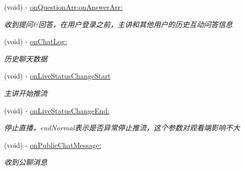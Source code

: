 \begin{DoxyCompactItemize}
(void) -\/ \hyperlink{protocol_request_data_delegate_01-p_a5995fc6c05c04b1f0a16469d574a5cd5}{on\+Question\+Arr\+:on\+Answer\+Arr\+:}
\begin{DoxyCompactList}\small\item\em 收到提问\&回答，在用户登录之前，主讲和其他用户的历史互动问答信息 \end{DoxyCompactList}\item 
\mbox{\label{protocol_request_data_delegate_01-p_a1c0314c63eb388f7a3bd177a5dcb797c}} 
(void) -\/ \hyperlink{protocol_request_data_delegate_01-p_a1c0314c63eb388f7a3bd177a5dcb797c}{on\+Chat\+Log\+:}
\begin{DoxyCompactList}\small\item\em 历史聊天数据 \end{DoxyCompactList}\item 
\mbox{\label{protocol_request_data_delegate_01-p_aafe0d41665c810e8f42fa0482711ff10}} 
(void) -\/ \hyperlink{protocol_request_data_delegate_01-p_aafe0d41665c810e8f42fa0482711ff10}{on\+Live\+Status\+Change\+Start}
\begin{DoxyCompactList}\small\item\em 主讲开始推流 \end{DoxyCompactList}\item 
\mbox{\label{protocol_request_data_delegate_01-p_a3f81e1f0908d02f763bd3de8648de94f}} 
(void) -\/ \hyperlink{protocol_request_data_delegate_01-p_a3f81e1f0908d02f763bd3de8648de94f}{on\+Live\+Status\+Change\+End\+:}
\begin{DoxyCompactList}\small\item\em 停止直播，end\+Normal表示是否异常停止推流，这个参数对观看端影响不大 \end{DoxyCompactList}\item 
\mbox{\label{protocol_request_data_delegate_01-p_a42345c7ea7ded09062d66ace74419ed2}} 
(void) -\/ \hyperlink{protocol_request_data_delegate_01-p_a42345c7ea7ded09062d66ace74419ed2}{on\+Public\+Chat\+Message\+:}
\begin{DoxyCompactList}\small\item\em 收到公聊消息 \end{DoxyCompactList}\item 
\mbox{\label{protocol_request_data_delegate_01-p_a5408d30b923a72a0f667fc7b074d4792}} 

\end{DoxyCompactItemize}
